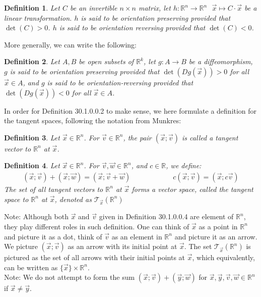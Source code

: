 \documentclass[15pt]{book}
\theoremstyle{break}
\theoremstyle{break}
\newtheorem{defn}{Definition}[corL]
\newcommand{\R}{\mathbb{R}}
\newcommand{\T}{\mathcal{T}}
\newcommand{\note}{\color{red}Note: \color{black}}
\begin{document}
\begin{defn}
Let $C$ be an invertible $n\times n$ matrix, let $h:\R^n \to \R^n \ \ \ \vec{x}\mapsto C\cdot \vec{x}$ be a linear transformation. $h$ is said to be orientation preserving provided that $\det(C)>0$. $h$ is said to be orientation reversing provided that $\det(C)<0$. 
\end{defn}

More generally, we can write the following:
\begin{defn}
Let $A,B$ be open subsets of $\R^k$, let $g:A \to B$ be a diffeomorphism, $g$ is said to be orientation preserving provided that $\det(Dg(\vec{x}))>0$ for all $\vec{x}\in A$, and $g$ is said to be orientation-reversing provided that $\det(Dg(\vec{x}))<0$ for all $\vec{x}\in A$. 
\end{defn}

In order for Definition 30.1.0.0.2 to make sense, we here formulate a definition for the tangent spaces, following the notation from Munkres:
\begin{defn}
Let $\vec{x}\in \R^n$. For $\vec{v}\in \R^n$, the pair $(\vec{x};\vec{v})$ is called a tangent vector to $\R^n$ at $\vec{x}$. 
\end{defn}

\begin{defn}
Let $\vec{x}\in \R^n$. For $\vec{v},\vec{w}\in \R^n$, and $c \in \R$, we define:
\begin{align*}
(\vec{x};\vec{v}) + (\vec{x};\vec{w}) = (\vec{x}; \vec{v}+\vec{w})\qquad\qquad\qquad c(\vec{x};\vec{v}) = (\vec{x};c\vec{v})
\end{align*}
The set of all tangent vectors to $\R^n$ at $\vec{x}$ forms a vector space, called the tangent space to $\R^n$ at $\vec{x}$, denoted as $\T_{\vec{x}}(\R^n)$
\end{defn}

\note Although both $\vec{x}$ and $\vec{v}$ given in Definition 30.1.0.0.4 are element of $\R^n$, they play different roles in such definition. One can think of $\vec{x}$ as a point in $\R^n$ and picture it as a dot, think of $\vec{v}$ as an element in $\R^n$ and picture it as an arrow. We picture $(\vec{x};\vec{v})$ as an arrow with its initial point at $\vec{x}$. The set $\T_{\vec{x}}(\R^n)$ is pictured as the set of all arrows with their initial points at $\vec{x}$, which equivalently, can be written as $\{\vec{x}\}\times \R^n$. \\

\note We do not attempt to form the sum $(\vec{x};\vec{v})+(\vec{y};\vec{w})$ for $\vec{x},\vec{y},\vec{v},\vec{w} \in \R^n$ if $\vec{x}\neq \vec{y}$.
\end{document}
